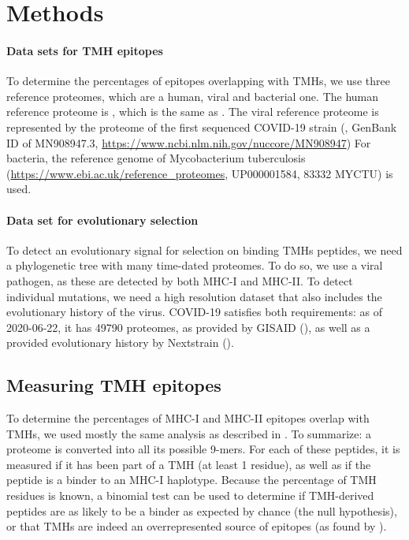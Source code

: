 \section{Methods}

\paragraph{Data sets for TMH epitopes}

To determine the percentages of epitopes overlapping
with TMHs, we use three reference proteomes, which are
a human, viral and bacterial one.
The human reference proteome is , 
which is the same as \cite{bianchi2017}.
The viral reference proteome is represented by
the proteome of the first sequenced COVID-19 strain (\cite{wu2020new},
GenBank ID of MN908947.3, \url{https://www.ncbi.nlm.nih.gov/nuccore/MN908947})
For bacteria, the reference genome of 
Mycobacterium tuberculosis (\url{https://www.ebi.ac.uk/reference_proteomes}, UP000001584, 
83332 MYCTU) is used.

\paragraph{Data set for evolutionary selection}

To detect an evolutionary signal for selection on binding
TMHs peptides, we need a phylogenetic tree with 
many time-dated proteomes.
To do so, we use a viral pathogen, as these are detected by both
MHC-I and MHC-II.
To detect individual mutations, we need a high resolution dataset
that also includes the evolutionary history of the virus.
COVID-19 satisfies both requirements:
as of 2020-06-22, it has 49790 proteomes, as provided by GISAID (\cite{shu2017gisaid}),
as well as a provided evolutionary history by Nextstrain (\cite{hadfield2018nextstrain}).

\subsection{Measuring TMH epitopes}

To determine the percentages of MHC-I and MHC-II epitopes overlap
with TMHs, we used mostly the same analysis as described in \cite{bianchi2017}.
To summarize: a proteome is converted into all its possible 9-mers. For each
of these peptides, it is measured if it has been part of a TMH (at least
1 residue), as well as if the peptide is a binder to an MHC-I haplotype.
Because the percentage of TMH residues is known, a binomial test can be
used to determine if TMH-derived peptides are as likely to be a binder
as expected by chance (the null hypothesis), or that TMHs are indeed an
overrepresented source of epitopes (as found by \cite{bianchi2017}).

